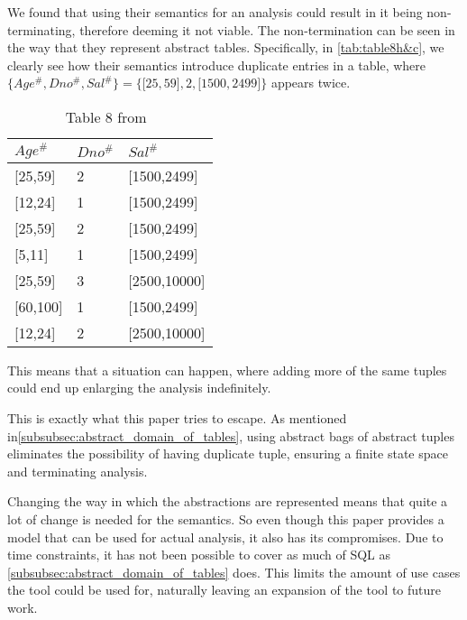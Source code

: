 We found that using their semantics for an analysis could result in it being non-terminating,
therefore deeming it not viable.
The non-termination can be seen in the way that they represent abstract tables.
Specifically, in \autoref{tab:table8h&c},
we clearly see how their semantics introduce duplicate entries in a table, where $\{Age^\#,Dno^\#,Sal^\#\}=\{{[}25,59{]},2,{[}1500,2499{]}\}$ appears twice.
\begin{table}[]
    \centering
    \caption{Table 8 from~\cite{halder_abstract_2012}}
    \begin{tabular}{lll}
        \toprule
        $Age^\#$ & $Dno^\#$ & $Sal^\#$ \\ \midrule
        {[}25,59{]}             & 2                       & {[}1500,2499{]}         \\
        {[}12,24{]}             & 1                       & {[}1500,2499{]}         \\
        {[}25,59{]}             & 2                       & {[}1500,2499{]}         \\
        {[}5,11{]}              & 1                       & {[}1500,2499{]}         \\
        {[}25,59{]}             & 3                       & {[}2500,10000{]}        \\
        {[}60,100{]}            & 1                       & {[}1500,2499{]}         \\
        {[}12,24{]}             & 2                       & {[}2500,10000{]}        \\ \bottomrule
    \end{tabular}\label{tab:table8h&c}
\end{table}
This means that a situation can happen, where adding more of the same tuples could end up enlarging the analysis indefinitely.

This is exactly what this paper tries to escape.
As mentioned in\autoref{subsubsec:abstract_domain_of_tables}, using abstract bags of abstract tuples eliminates the possibility of having duplicate tuple, ensuring a finite state space and terminating analysis.

Changing the way in which the abstractions are represented means that quite a lot of change is needed for the semantics.
So even though this paper provides a model that can be used for actual analysis, it also has its compromises.
Due to time constraints, it has not been possible to cover as much of SQL as \autoref{subsubsec:abstract_domain_of_tables} does.
This limits the amount of use cases the tool could be used for, naturally leaving an expansion of the tool to future work.

